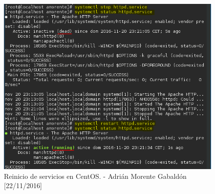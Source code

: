\begin{itemize}
	\begin{figure}[H]
		\centering
		\includegraphics[scale=0.75]{systemctl-centos}
		\caption{Reinicio de servicios en CentOS. - Adrián Morente Gabaldón [22/11/2016]}
		\label{fig:figura5}
	\end{figure}
\end{itemize}


